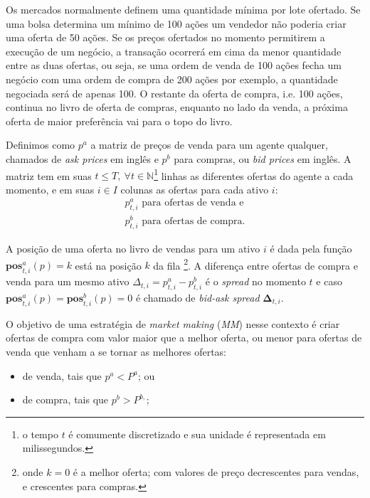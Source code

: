Os mercados normalmente definem uma quantidade mínima por lote ofertado. Se uma bolsa determina um mínimo de 100 ações um vendedor não poderia criar uma oferta de 50 ações. Se os preços ofertados no momento permitirem a execução de um negócio, a transação ocorrerá em cima da menor quantidade entre as duas ofertas, ou seja, se uma ordem de venda de 100 ações fecha um negócio com uma ordem de compra de 200 ações por exemplo, a quantidade negociada será de apenas 100. O restante da oferta de compra, i.e. 100 ações, continua no livro de oferta de compras, enquanto no lado da venda, a próxima oferta de maior preferência vai para o topo do livro. 

Definimos como $p^{a}$ a matriz de preços de venda para um agente qualquer, chamados de \textit{ask prices} em inglês e $p^{b}$ para compras, ou \textit{bid prices} em inglês. A matriz tem em suas $t \leq T, \  \forall t \in \mathbb{N}$\footnote{o tempo $t$ é comumente discretizado e sua unidade é representada em milissegundos.} linhas as diferentes ofertas do agente a cada momento, e em suas $i \in I$ colunas as ofertas para cada ativo $i$: 
\begin{equation*}
	\begin{aligned}
		p^{a}_{t, i} \text{ para ofertas de venda e}  \\
		p^{b}_{t, i} \text{ para ofertas de compra.}
	\end{aligned}
\end{equation*}

A posição de uma oferta no livro de vendas para um ativo $i$ é dada pela função $\mathbf{pos}_{t, i}^{a}(p) = k$ está na posição $k$ da fila \footnote{onde $k = 0$ é a melhor oferta; com valores de preço decrescentes para vendas, e crescentes para compras.}. A diferença entre ofertas de compra e venda para um mesmo ativo $\Delta_{t, i} = p_{t, i}^{a} - p_{t, i}^{b}$ é o \textit{spread} no momento $t$ e caso $\mathbf{pos}_{t, i}^{a}(p) = \mathbf{pos}_{t, i}^{b}(p) = 0$ é chamado de \textit{bid-ask spread} $\mathbf{\Delta}_{t, i}$.

O objetivo de uma estratégia de \textit{market making} (\textit{MM}) nesse contexto é criar ofertas de compra com valor maior que a melhor oferta, ou menor para ofertas de venda que venham a se tornar as melhores ofertas:

\begin{itemize}
    \item de venda, tais que $p^{a} < P^{a}$; ou 
    \item de compra, tais que $p^{b} > P^{b,}$;
\end{itemize}

